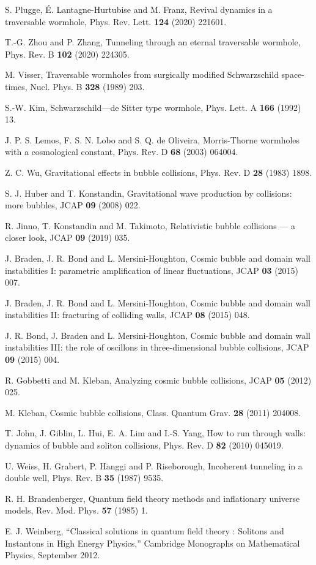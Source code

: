 \documentclass[12pt]{article}
\begin{document}
\begin{thebibliography}{99}
S. Plugge, É. Lantagne-Hurtubise and M. Franz, Revival dynamics in a traversable wormhole, Phys. Rev. Lett. {\bf124} (2020) 221601.

T.-G. Zhou and P. Zhang, Tunneling through an eternal traversable wormhole, Phys. Rev. B {\bf102} (2020) 224305.

M. Visser, Traversable wormholes from surgically modified Schwarzschild space-times, Nucl. Phys. B {\bf328} (1989) 203.

S.-W. Kim, Schwarzschild—de Sitter type wormhole, Phys. Lett. A {\bf166} (1992) 13.

J. P. S. Lemos, F. S. N. Lobo and S. Q. de Oliveira, Morris-Thorne wormholes with a cosmological constant, Phys. Rev. D  {\bf68} (2003) 064004.

Z. C. Wu, Gravitational effects in bubble collisions, Phys. Rev. D  {\bf28} (1983) 1898.

S. J. Huber and T. Konstandin, Gravitational wave production by collisions: more bubbles, JCAP {\bf09} (2008) 022.

R. Jinno, T. Konstandin and M. Takimoto, Relativistic bubble collisions — a closer look, JCAP {\bf09} (2019) 035.

J. Braden, J. R. Bond and L. Mersini-Houghton, Cosmic bubble and domain wall instabilities I: parametric amplification of linear fluctuations, JCAP {\bf03} (2015) 007.

J. Braden, J. R. Bond and L. Mersini-Houghton, Cosmic bubble and domain wall instabilities II: fracturing of colliding walls, JCAP {\bf08} (2015) 048.

J. R. Bond, J. Braden and L. Mersini-Houghton, Cosmic bubble and domain wall instabilities III: the role of oscillons in three-dimensional bubble collisions, JCAP {\bf09} (2015) 004.

R. Gobbetti and M. Kleban, Analyzing cosmic bubble collisions, JCAP {\bf05} (2012) 025.

M. Kleban, Cosmic bubble collisions, Class. Quantum Grav. {\bf28} (2011) 204008.

T. John, J. Giblin, L. Hui, E. A. Lim and I.-S. Yang, How to run through walls: dynamics of bubble and soliton collisions, Phys. Rev. D {\bf82} (2010) 045019.

U. Weiss, H. Grabert, P. H$\mathrm{\ddot{a}}$nggi and P. Riseborough, Incoherent tunneling in a double well, Phys. Rev. B {\bf35} (1987) 9535.

R. H. Brandenberger, Quantum field theory methods and inflationary universe models, Rev. Mod. Phys. {\bf57} (1985) 1.

E. J. Weinberg, “Classical solutions in quantum field theory : Solitons and Instantons in High Energy Physics,” Cambridge Monographs on Mathematical Physics, September 2012.







\end{thebibliography}
\end{document}
